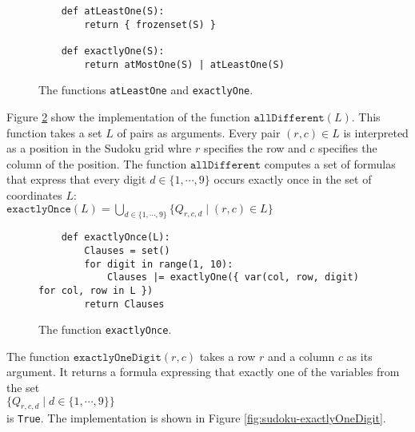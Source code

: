 \begin{figure}[!ht]
\centering
\begin{verbatim}
    def atLeastOne(S):
        return { frozenset(S) }
    
    def exactlyOne(S):
        return atMostOne(S) | atLeastOne(S)
\end{verbatim}
\vspace*{-0.3cm}
\caption{The functions \texttt{atLeastOne} and \texttt{exactlyOne}.}
\label{fig:sudoku-exactly}
\end{figure}

Figure \ref{fig:sudoku-exactlyOnce} show the implementation of the function
$\texttt{allDifferent}(L)$.  This function takes a set $L$ of pairs as arguments.  Every pair $(r,c) \in L$ is
interpreted as a position in the Sudoku grid whre $r$ specifies the row and $c$ specifies the column of the
position.  The function $\texttt{allDifferent}$ computes a set of formulas that express that every digit
$d \in \{1,\cdots,9\}$ occurs exactly once in the set of coordinates $L$: 
\\[0.2cm]
\hspace*{1.3cm}
$\texttt{exactlyOnce}(L) = \bigcup\limits_{d \in \{1,\cdots,9\}} \bigl\{ Q_{r,c,d} \mid (r,c) \in L \bigl\}$


\begin{figure}[!ht]
\centering
\begin{verbatim}
    def exactlyOnce(L):
        Clauses = set()
        for digit in range(1, 10):
            Clauses |= exactlyOne({ var(col, row, digit)  for col, row in L })
        return Clauses
\end{verbatim}
\vspace*{-0.3cm}
\caption{The function \texttt{exactlyOnce}.}
\label{fig:sudoku-exactlyOnce}
\end{figure}

The function $\texttt{exactlyOneDigit}(r, c)$ takes a row $r$ and a column $c$ as its argument.  It returns a
formula expressing that exactly one of the variables from the set
\\[0.2cm]
\hspace*{1.3cm}
$\bigl\{ Q_{r,c,d} \mid d \in \{1,\cdots, 9\} \bigr\}$
\\[0.2cm]
is \texttt{True}. The implementation is shown in Figure \ref{fig:sudoku-exactlyOneDigit}.

